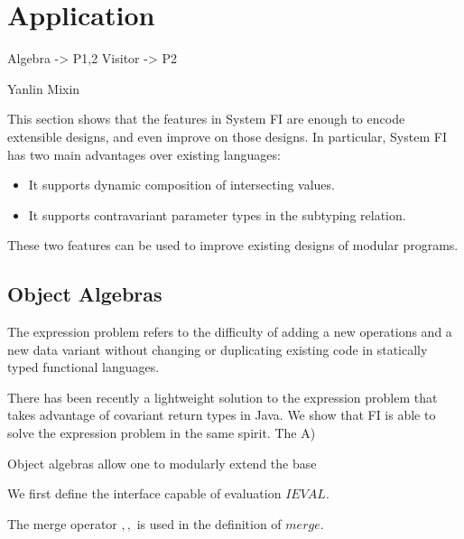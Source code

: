 \section{Application}

Algebra -> P1,2
Visitor -> P2

Yanlin
Mixin

This section shows that the features in System FI are enough to encode
extensible designs, and even improve on those designs. In particular,
System FI has two main advantages over existing languages:

\begin{itemize}
\item It supports dynamic composition of intersecting values.
\item It supports contravariant parameter types in the subtyping relation.
\end{itemize}

These two features can be used to improve existing designs
of modular programs.

\subsection{Object Algebras}


The expression problem refers to the difficulty of adding a new operations and a
new data variant without changing or duplicating existing code in statically
typed functional languages.

There has been recently a lightweight solution to the expression problem that
takes advantage of covariant return types in Java. We show that FI is able to
solve the expression problem in the same spirit. The
A)


Object algebras allow one to modularly extend the base

We first define the interface capable of evaluation $ IEVAL $.


The merge operator $ ,, $ is used in the definition of $ merge $.


